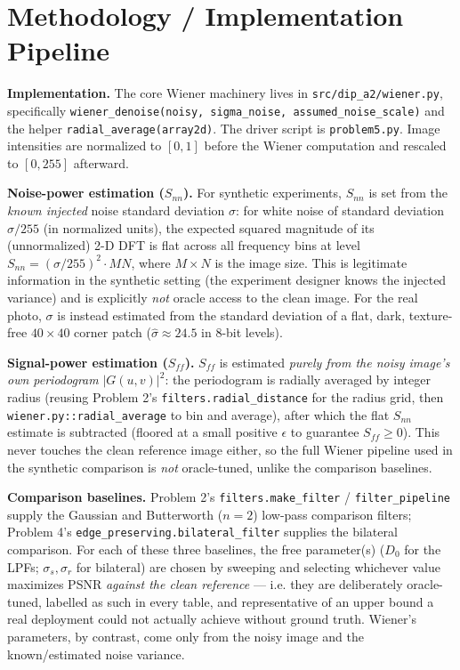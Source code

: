 \documentclass[11pt]{article}
\begin{document}
\section{Methodology / Implementation Pipeline}

\textbf{Implementation.} The core Wiener machinery lives in
\texttt{src/dip\_a2/wiener.py}, specifically \texttt{wiener\_denoise(noisy, sigma\_noise,
assumed\_noise\_scale)} and the helper \texttt{radial\_average(array2d)}. The driver script
is \texttt{problem5.py}. Image intensities are normalized to $[0,1]$ before the Wiener
computation and rescaled to $[0,255]$ afterward.

\textbf{Noise-power estimation ($S_{nn}$).} For synthetic experiments, $S_{nn}$ is set from
the \emph{known injected} noise standard deviation $\sigma$: for white noise of standard
deviation $\sigma/255$ (in normalized units), the expected squared magnitude of its
(unnormalized) 2-D DFT is flat across all frequency bins at level
$S_{nn} = (\sigma/255)^2 \cdot M N$, where $M\times N$ is the image size. This is legitimate
information in the synthetic setting (the experiment designer knows the injected variance) and
is explicitly \emph{not} oracle access to the clean image. For the real photo, $\sigma$ is
instead estimated from the standard deviation of a flat, dark, texture-free $40\times40$ corner
patch ($\hat\sigma \approx 24.5$ in 8-bit levels).

\textbf{Signal-power estimation ($S_{ff}$).} $S_{ff}$ is estimated \emph{purely from the noisy
image's own periodogram} $|G(u,v)|^2$: the periodogram is radially averaged by integer radius
(reusing Problem 2's \texttt{filters.radial\_distance} for the radius grid, then
\texttt{wiener.py::radial\_average} to bin and average), after which the flat $S_{nn}$ estimate
is subtracted (floored at a small positive $\epsilon$ to guarantee $S_{ff}\ge 0$). This never
touches the clean reference image either, so the full Wiener pipeline used in the synthetic
comparison is \emph{not} oracle-tuned, unlike the comparison baselines.

\textbf{Comparison baselines.} Problem 2's \texttt{filters.make\_filter} /
\texttt{filter\_pipeline} supply the Gaussian and Butterworth ($n=2$) low-pass comparison
filters; Problem 4's \texttt{edge\_preserving.bilateral\_filter} supplies the bilateral
comparison. For each of these three baselines, the free parameter(s) ($D_0$ for the LPFs;
$\sigma_s,\sigma_r$ for bilateral) are chosen by sweeping and selecting whichever value
maximizes PSNR \emph{against the clean reference} — i.e. they are deliberately oracle-tuned,
labelled as such in every table, and representative of an upper bound a real deployment could
not actually achieve without ground truth. Wiener's parameters, by contrast, come only from the
noisy image and the known/estimated noise variance.
\end{document}
